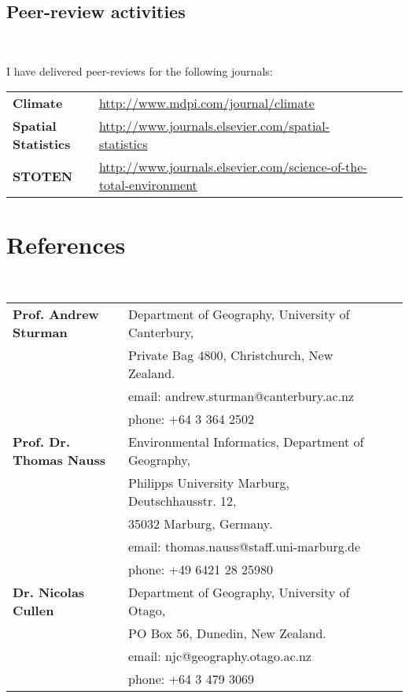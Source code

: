 \documentclass[a4paper,11pt]{article}
\begin{document}
\subsection{Peer-review activities}\\

\linebreak{}

I have delivered peer-reviews for the following journals:\\
\begin{tabular}{llll} \\
\textbf{Climate} & \url{http://www.mdpi.com/journal/climate}\\
\textbf{Spatial Statistics} & \url{http://www.journals.elsevier.com/spatial-statistics}\\
\textbf{STOTEN} & \url{http://www.journals.elsevier.com/science-of-the-total-environment}\\
\end{tabular}
\pagebreak{}

\section{References}
\hrulefill \\
\begin{tabular}{llll} \\
\textbf{Prof. Andrew Sturman} & Department of Geography, University of Canterbury,\\
					 & Private Bag 4800, Christchurch, New Zealand.\\
					 & email: andrew.sturman@canterbury.ac.nz\\
					 & phone: +64 3 364 2502\\

\textbf{Prof. Dr. Thomas Nauss} & Environmental Informatics, Department of Geography,\\
					   & Philipps University Marburg, Deutschhausstr. 12,\\
					   & 35032 Marburg, Germany.\\
					   & email: thomas.nauss@staff.uni-marburg.de\\
					   & phone: +49 6421 28 25980\\

\textbf{Dr. Nicolas Cullen} & Department of Geography, University of Otago,\\
				   & PO Box 56, Dunedin, New Zealand.\\
				   & email: njc@geography.otago.ac.nz\\
				   & phone: +64 3 479 3069
\end{tabular}
\linebreak{}

\begin{publications}
\hrulefill \\
\end{publications}
\end{document}
